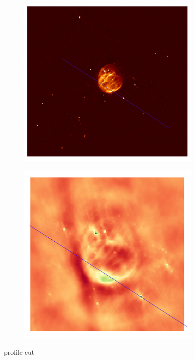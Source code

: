 \begin{figure}
	\centering
	\begin{subfigure}[b]{0.3\linewidth}
		\includegraphics[width=\linewidth, trim={180px 170px 160px 136px}, clip]{./chapters/05.results/pic_G55_7_lined.png}
	\end{subfigure}
	\begin{subfigure}[b]{0.3\linewidth}
		\includegraphics[width=\linewidth, trim={18px 19px 18px 18px}, clip]{./chapters/05.results/raw_image_lined.png}
	\end{subfigure}
	\caption{profile cut}
\end{figure}


